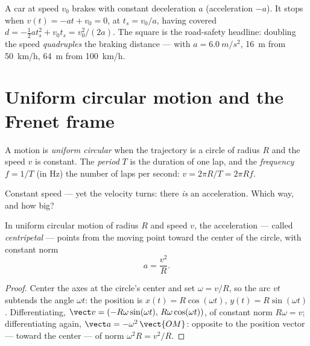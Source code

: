 \begin{example}\label{ex:g12:kinematics-2d:braking}
A car at speed $v_0$ brakes with constant deceleration $a$
(acceleration $-a$). It stops when $v(t) = -a t + v_0 = 0$, at
$t_s = v_0/a$, having covered $d = -\tfrac12 a t_s^2 + v_0 t_s =
v_0^2/(2a)$. The square is the road-safety headline: doubling the
speed \emph{quadruples} the braking distance --- with $a =
\qty{6.0}{m/s^2}$, \qty{16}{m} from \qty{50}{km/h}, \qty{64}{m} from
\qty{100}{km/h}.
\end{example}

\section{Uniform circular motion and the Frenet frame}

\begin{definition}\label{def:g12:kinematics-2d:ucm}
A motion is \emph{uniform circular}
when the trajectory is a circle of radius $R$ and the speed $v$ is
constant. The \emph{period} $T$ is the
duration of one lap, and the \emph{frequency} $f = 1/T$ (in \unit{Hz}) the number of laps per second:
$v = 2\pi R/T = 2\pi R f$.
\end{definition}

Constant speed --- yet the velocity turns: there \emph{is} an
acceleration. Which way, and how big?

\begin{theorem}\label{thm:g12:kinematics-2d:centripetal}
%
In uniform circular motion of radius $R$ and speed $v$, the
acceleration --- called \emph{centripetal} --- points from the moving
point toward the center of the circle, with constant norm
\[
a = \frac{v^2}{R}.
\]
\end{theorem}

\begin{proof}
Center the axes at the circle's center and set $\omega = v/R$, so the
arc $v t$ subtends the angle $\omega t$: the position is
$x(t) = R\cos(\omega t)$, $y(t) = R\sin(\omega t)$. Differentiating,
$\vect v = (-R\omega\sin(\omega t),\, R\omega\cos(\omega t))$, of
constant norm $R\omega = v$; differentiating again,
$\vect a = -\omega^2\,\vect{OM}$: opposite to the position vector ---
toward the center --- of norm $\omega^2 R = v^2/R$.
\end{proof}

